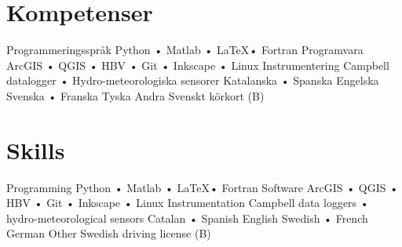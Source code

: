 \ifswedish
    \section{Kompetenser}
        \skill
            {Programmeringsspråk}
            {Python • Matlab • \LaTeX • Fortran}
        \skill
            {Programvara}
            {ArcGIS • QGIS • HBV • Git • Inkscape • Linux}
        \skill
            {Instrumentering}
            {Campbell datalogger • Hydro-meteorologiska sensorer}
        \languages
            {Katalanska • Spanska}
            {Engelska}
            {Svenska • Franska}
            {Tyska}
        \skill
            {Andra}
            {Svenskt körkort (B)}
\else
    \section{Skills}
        \skill
            {Programming}
            {Python • Matlab • \LaTeX • Fortran}
        \skill
            {Software}
            {ArcGIS • QGIS • HBV • Git • Inkscape • Linux}
        \skill
            {Instrumentation}
            {Campbell data loggers • hydro-meteorological sensors}
        \languages
            {Catalan • Spanish}
            {English}
            {Swedish • French}
            {German}
        \skill
            {Other}
            {Swedish driving license (B)}
\fi
